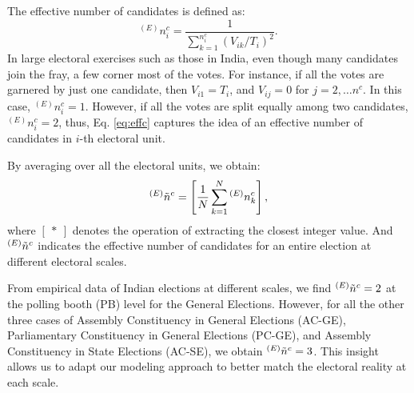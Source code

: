 The effective number of candidates is defined as:
\begin{equation}
    ^{(E)}n^c_i = \frac{1}{\sum_{k=1}^{n^c_i} (V_{ik} / T_{i})^2}.
    \label{eq:effc}
\end{equation}
In large electoral exercises such as those in India, even though many candidates join the fray, a few corner most of the votes. For instance, if all the votes are garnered by just one candidate, then $V_{i1}=T_i$, and $V_{ij}=0$ for $j=2, \dots n^c$. In this case, $^{(E)}n^c_i=1$. However, if all the votes are split equally among two candidates, $^{(E)}n^c_i=2$, thus, Eq. \ref{eq:effc} captures the idea of an effective number of candidates in $i$-th electoral unit.

By averaging over all the electoral units, we obtain:
\begin{equation}
    ^{(E)}\Tilde{n}^c =  \left[\frac{1}{N}\sum_{k=1}^{N}{}^{(E)}n^{c}_k \right],
\end{equation}
where $\left[\:*\:\right]$ denotes the operation of extracting the closest integer value. And $^{(E)}\Tilde{n}^c $ indicates the effective number of candidates for an entire election at different electoral scales.

From empirical data of Indian elections at different scales, we find $^{(E)}\Tilde{n}^c = 2$ at the polling booth (PB) level for the General Elections. However, for all the other three cases of Assembly Constituency in General Elections (AC-GE), Parliamentary Constituency in General Elections (PC-GE), and Assembly Constituency in State Elections (AC-SE), we obtain $^{(E)}\Tilde{n}^c = 3$. This insight allows us to adapt our modeling approach to better match the electoral reality at each scale.
